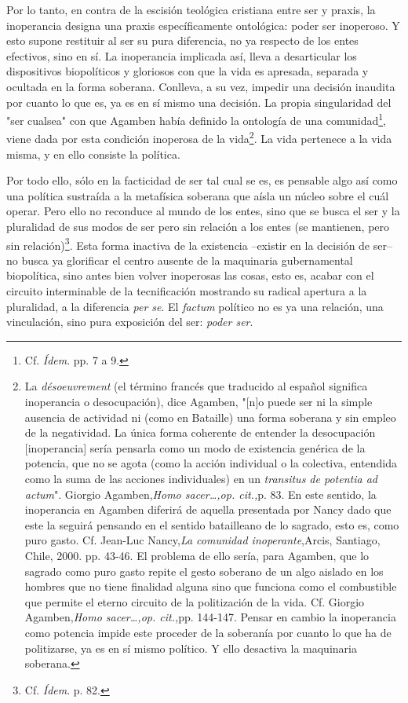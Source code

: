 \documentclass{book}
\begin{document}
Por lo tanto, en contra de la escisión teológica cristiana entre ser y
praxis, la inoperancia designa una praxis específicamente ontológica:
poder ser inoperoso. Y esto supone restituir al ser su pura diferencia,
no ya respecto de los entes efectivos, sino en sí. La inoperancia
implicada así, lleva a desarticular los dispositivos biopolíticos y
gloriosos con que la vida es apresada, separada y ocultada en la forma
soberana. Conlleva, a su vez, impedir una decisión inaudita por cuanto
lo que es, ya es en sí mismo una decisión. La propia singularidad del
"ser cualsea" con que Agamben había definido la ontología de una
comunidad\footnote{Cf. \emph{Ídem}. pp. 7 a 9.}, viene dada por esta
condición inoperosa de la vida\footnote{La \emph{désoeuvrement} (el
  término francés que traducido al español significa inoperancia o
  desocupación), dice Agamben, "{[}n{]}o puede ser ni la simple ausencia
  de actividad ni (como en Bataille) una forma soberana y sin empleo de
  la negatividad. La única forma coherente de entender la desocupación
  {[}inoperancia{]} sería pensarla como un modo de existencia genérica
  de la potencia, que no se agota (como la acción individual o la
  colectiva, entendida como la suma de las acciones individuales) en un
  \emph{transitus de potentia ad actum}". Giorgio Agamben,\emph{Homo
  sacer\ldots,op. cit.,}p. 83. En este sentido, la inoperancia en
  Agamben diferirá de aquella presentada por Nancy dado que este la
  seguirá pensando en el sentido batailleano de lo sagrado, esto es,
  como puro gasto. Cf. Jean-Luc Nancy,\emph{La comunidad
  inoperante},Arcis, Santiago, Chile, 2000. pp. 43-46. El problema de
  ello sería, para Agamben, que lo sagrado como puro gasto repite el
  gesto soberano de un algo aislado en los hombres que no tiene
  finalidad alguna sino que funciona como el combustible que permite el
  eterno circuito de la politización de la vida. Cf. Giorgio
  Agamben,\emph{Homo sacer\ldots,op. cit.,}pp. 144-147. Pensar en cambio
  la inoperancia como potencia impide este proceder de la soberanía por
  cuanto lo que ha de politizarse, ya es en sí mismo político. Y ello
  desactiva la maquinaria soberana.}. La vida pertenece a la vida misma,
y en ello consiste la política.

Por todo ello, sólo en la facticidad de ser tal cual se es, es pensable
algo así como una política sustraída a la metafísica soberana que aísla
un núcleo sobre el cuál operar. Pero ello no reconduce al mundo de los
entes, sino que se busca el ser y la pluralidad de sus modos de ser pero
sin relación a los entes (se mantienen, pero sin relación)\footnote{Cf.
  \emph{Ídem}. p. 82.}. Esta forma inactiva de la existencia --existir
en la decisión de ser-- no busca ya glorificar el centro ausente de la
maquinaria gubernamental biopolítica, sino antes bien volver inoperosas
las cosas, esto es, acabar con el circuito interminable de la
tecnificación mostrando su radical apertura a la pluralidad, a la
diferencia \emph{per se}. El \emph{factum} político no es ya una
relación, una vinculación, sino pura exposición del ser: \emph{poder
ser}.
\end{document}
